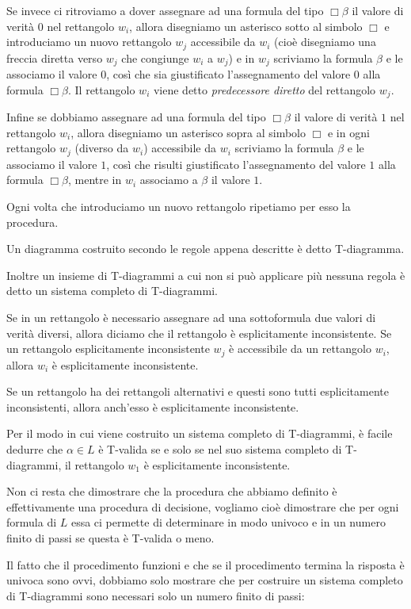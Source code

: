 \documentclass[a4paper, titlepage, 12pt]{report}
\begin{document}
Se invece ci ritroviamo a dover assegnare ad una formula del tipo $\Box \beta$
il valore di verità $0$ nel rettangolo $w_i$, allora disegniamo un asterisco sotto al simbolo $\Box$
e introduciamo un nuovo rettangolo $w_j$ accessibile da $w_i$ (cioè disegniamo una freccia diretta verso $w_j$ che congiunge $w_i$ a $w_j$)
e in $w_j$ scriviamo la formula $\beta$ e le associamo il valore $0$, così che sia giustificato
l'assegnamento del valore $0$ alla formula $\Box \beta$.
Il rettangolo $w_i$ viene detto \emph{predecessore diretto} del rettangolo $w_j$.

Infine se dobbiamo assegnare ad una formula del tipo $\Box \beta$
il valore di verità $1$ nel rettangolo $w_i$, allora disegniamo un asterisco sopra al simbolo $\Box$
e in ogni rettangolo $w_j$ (diverso da $w_i$)  accessibile da $w_i$ scriviamo la formula $\beta$ e le associamo il valore $1$,
così che risulti giustificato l'assegnamento del valore $1$ alla formula $\Box \beta$,
mentre in $w_i$ associamo a $\beta$ il valore $1$.

Ogni volta che introduciamo un nuovo rettangolo ripetiamo per esso la procedura.

Un diagramma costruito secondo le regole appena descritte è detto T-diagramma.

Inoltre un insieme di T-diagrammi a cui non si può applicare più nessuna regola è detto
un sistema completo di T-diagrammi.

Se in un rettangolo è necessario assegnare ad una sottoformula due valori di verità diversi,
allora diciamo che il rettangolo è esplicitamente inconsistente.
Se un rettangolo esplicitamente inconsistente $w_j$ è accessibile da un rettangolo $w_i$,
allora $w_i$ è esplicitamente inconsistente.

Se un rettangolo ha dei rettangoli alternativi e questi sono tutti esplicitamente inconsistenti,
allora anch'esso è esplicitamente inconsistente.

Per il modo in cui viene costruito un sistema completo di T-diagrammi, è facile dedurre che
$\alpha \in L$ è T-valida se e solo se nel suo sistema completo di T-diagrammi, il rettangolo
$w_1$ è esplicitamente inconsistente.

Non ci resta che dimostrare che la procedura che abbiamo definito è effettivamente
una procedura di decisione, vogliamo cioè dimostrare che per ogni formula di $L$
essa ci permette di determinare in modo univoco e in un numero finito di passi
se questa è T-valida o meno.

Il fatto che il procedimento funzioni e che se il procedimento termina la risposta è univoca
sono ovvi, dobbiamo solo mostrare che per costruire un sistema completo di T-diagrammi
sono necessari solo un numero finito di passi:
\end{document}
